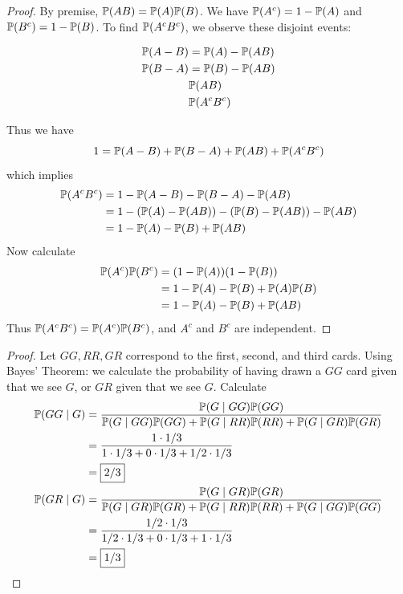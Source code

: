 \documentclass[a4paper]{article}
\begin{document}
\begin{proof}[Proof] 
By premise, \(\mathbb{P}(AB) = \mathbb{P}(A)\mathbb{P}(B)\). We have \(\mathbb{P}(A^{c}) = 1 - \mathbb{P}(A)\) and \(\mathbb{P}(B^{c}) = 1 - \mathbb{P}(B)\). To find \(\mathbb{P}(A^{c} B ^{c})\), we observe these disjoint events:

\begin{align*}
	\mathbb{P}(A-B) & = \mathbb{P}(A) - \mathbb{P}(AB) \\
	\mathbb{P}(B-A) & = \mathbb{P}(B) - \mathbb{P}(AB) \\
	           & \mathbb{P}(AB) \\
		   & \mathbb{P}(A^{c}B^{c})
\end{align*}

Thus we have
\[
	1 = \mathbb{P}(A-B) + \mathbb{P}(B-A) + \mathbb{P}(AB) + \mathbb{P}(A^{c}B^{c})
\]
which implies
\begin{align*}
	\mathbb{P}(A^{c}B^{c}) & = 1 - \mathbb{P}(A-B) - \mathbb{P}(B-A) - \mathbb{P}(AB) \\
	 & = 1 - (\mathbb{P}(A) - \mathbb{P}(AB)) - (\mathbb{P}(B) - \mathbb{P}(AB)) - \mathbb{P}(AB) \\
	 & = 1 - \mathbb{P}(A) - \mathbb{P}(B) + \mathbb{P}(AB)
\end{align*}
Now calculate
\begin{align*}
	\mathbb{P}(A^{c})\mathbb{P}(B^{c}) & = (1 - \mathbb{P}(A))(1 - \mathbb{P}(B)) \\
	 & = 1 - \mathbb{P}(A) - \mathbb{P}(B) + \mathbb{P}(A)\mathbb{P}(B) \\
	 & = 1 - \mathbb{P}(A) - \mathbb{P}(B) + \mathbb{P}(AB)
\end{align*}
Thus \(\mathbb{P}(A^{c}B^{c}) = \mathbb{P}(A^{c})\mathbb{P}(B^{c})\), and \(A^{c}\) and \(B^{c}\) are independent.
\end{proof}

\begin{proof}[Proof] 
Let \(GG, RR, GR\) correspond to the first, second, and third cards. Using Bayes' Theorem: we calculate the probability of having drawn a \(GG\) card given that we see \(G\), or \(GR\) given that we see \(G\). Calculate
\begin{align*}
	\mathbb{P}(GG \mid G) & = \frac{\mathbb{P}(G \mid GG) \mathbb{P}(GG)}{\mathbb{P}(G \mid GG)\mathbb{P}(GG) + \mathbb{P}(G \mid RR)\mathbb{P}(RR) + \mathbb{P}(G \mid GR)\mathbb{P}(GR)} \\
	 & = \frac{1 \cdot 1/3}{1 \cdot 1/3 + 0 \cdot 1/3 + 1/2 \cdot 1/3} \\
	 & = \boxed{2/3} \\
	\mathbb{P}(GR \mid G) & = \frac{\mathbb{P}(G \mid GR)\mathbb{P}(GR)}{\mathbb{P}(G \mid GR)\mathbb{P}(GR) + \mathbb{P}(G \mid RR)\mathbb{P}(RR) + \mathbb{P}(G \mid GG)\mathbb{P}(GG)} \\
	 & = \frac{1/2 \cdot 1/3}{1/2 \cdot 1/3 + 0 \cdot 1/3 + 1 \cdot 1/3} \\
	 & = \boxed{1/3}
\end{align*}
\end{proof}
\end{document}
